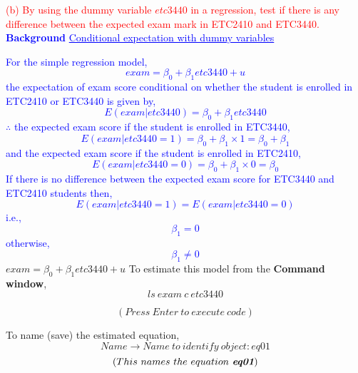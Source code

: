 \documentclass[12pt]{report}
\newenvironment{blueframed}[1][blue]
{\def\FrameCommand{\fboxsep=\FrameSep\fcolorbox{#1}{white}}%
	\MakeFramed {\advance\hsize-\width \FrameRestore}}
{\endMakeFramed}
\begin{document}
\newpage
\noindent \textcolor{red}
{
	(b) By using the dummy variable $etc3440$ in a regression, test if there is any difference between the expected exam mark in ETC2410 and ETC3440.
}
\justify
\begin{blueframed}
	\textcolor{blue}{\textbf{Background}}
	\vspace{-\baselineskip}
	\justify
	\textcolor{blue}{\underline{Conditional expectation with dummy variables}}
	
	\noindent \textcolor{blue}{For the simple regression model,$$exam = \beta_0 + \beta_1etc3440 + u$$ the expectation of exam score conditional on whether the student is enrolled in ETC2410 or ETC3440 is given by,
		$$E(exam|etc3440) = \beta_0 + \beta_1etc3440$$
		$\therefore$ the expected exam score if the student is enrolled in ETC3440, $$E(exam|etc3440=1) = \beta_0 + \beta_1{\times}1 = \beta_0 + \beta_1$$
		and the expected exam score if the student is enrolled in ETC2410, $$E(exam|etc3440=0) = \beta_0 + \beta_1{\times}0 = \beta_0$$ If there is no difference between the expected exam score for ETC3440 and ETC2410 students then, $$E(exam|etc3440=1) = E(exam|etc3440=0)$$ i.e.,
		$$\beta_1 = 0$$
		otherwise,
		$$\beta_1 \neq 0$$
	}
\end{blueframed}
\centering $exam = \beta_0 + \beta_1etc3440 + u$
\justify \noindent To estimate this model from the \textbf{Command window},
$$ls\ exam\ c\ etc3440$$
\begin{figure}[H]
	\centering
\end{figure}
\vspace{-\baselineskip}
$$(Press\ Enter\ to\ execute\ code)$$
\begin{figure}[H]
	\centering
\end{figure}
\vspace{-\baselineskip}
\noindent To name (save) the estimated equation,
$$Name \to Name\ to\ identify\ object: eq01$$
$$(This\ names\ the\ equation\ \textit{\textbf{eq01}})$$
\begin{figure}[H]
	\centering
\end{figure}
\vspace{-\baselineskip}
\begin{figure}[H]
	\centering
\end{figure}
\vspace{-\baselineskip}
\end{document}
